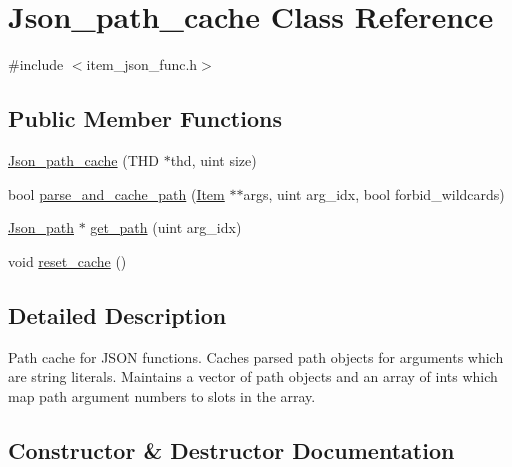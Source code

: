 \hypertarget{classJson__path__cache}{}\section{Json\+\_\+path\+\_\+cache Class Reference}
\label{classJson__path__cache}


{\ttfamily \#include $<$item\+\_\+json\+\_\+func.\+h$>$}

\subsection*{Public Member Functions}
\begin{DoxyCompactItemize}
\item 
\mbox{\hyperlink{classJson__path__cache_a453c9eeaf5a571e0ff119cb1ec8654f9}{Json\+\_\+path\+\_\+cache}} (T\+HD $\ast$thd, uint size)
\item 
bool \mbox{\hyperlink{classJson__path__cache_acbd772d2719861bc690199d212a36d43}{parse\+\_\+and\+\_\+cache\+\_\+path}} (\mbox{\hyperlink{classItem}{Item}} $\ast$$\ast$args, uint arg\+\_\+idx, bool forbid\+\_\+wildcards)
\item 
\mbox{\hyperlink{classJson__path}{Json\+\_\+path}} $\ast$ \mbox{\hyperlink{classJson__path__cache_ab4e16c6759d543643eee5fdb2abb8eef}{get\+\_\+path}} (uint arg\+\_\+idx)
\item 
void \mbox{\hyperlink{classJson__path__cache_a86df523345766a8dd4ee469253c35b60}{reset\+\_\+cache}} ()
\end{DoxyCompactItemize}


\subsection{Detailed Description}
Path cache for J\+S\+ON functions. Caches parsed path objects for arguments which are string literals. Maintains a vector of path objects and an array of ints which map path argument numbers to slots in the array. 

\subsection{Constructor \& Destructor Documentation}
\mbox{\label{classJson__path__cache_a453c9eeaf5a571e0ff119cb1ec8654f9}} 
